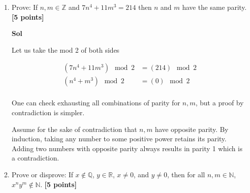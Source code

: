 \documentclass{article}
\begin{document}
\begin{enumerate}
\begin{equation}
    \begin{split}
        \left(\sqrt[3]{3}\right)^3 &= \left(\frac{p}{q}\right)^3\\
        3 &= \frac{p^3}{q^3}
    \end{split}
\end{equation}

from this, we see that \(p^3\) is divisible by \(3\). Since \(3\) is prime, \(p\) must be divisible by 3 by Euler's Theorem. We can rewrite \(p\) as \(3p_1\). 
\begin{equation}
    (3p_1)^3 = 3q^3 = 27p_1^3
\end{equation}

which implies 
\begin{equation}
    q^3 = 9p_1^3 = 3(3p_1^3)
\end{equation}

This also means that \(q^3\) is divisible by \(3\), which applying Euler's Theorem we see implies \(q\) is also divisible by 3. 

\(q\) and \(p\) are divisible by 3 which is a contradiction since we assumed \(\gcd(q,p)=1\).



\item Prove:  If $n, m \in \mathbb{Z}$ and $7 n^4 + 11 m^3 = 214$ then $n$ and $m$ have the same parity.  \textbf{[5 points]}

\textbf{Sol}

Let us take the mod 2 of both sides

\begin{equation}
\begin{split}
        (7 n^4 + 11 m^3) \mod 2 &= (214 ) \mod 2 \\
        (n^4 + m^3) \mod 2 &= (0) \mod 2 \\
\end{split}\end{equation}

One can check exhausting all combinations of parity for \(n,m\), but a proof by contradiction is simpler.

Assume for the sake of contradiction that \(n,m\) have opposite parity. By induction, taking any number to some positive power retains its parity. Adding two numbers with opposite parity always results in parity 1 which is a contradiction.


\item Prove or disprove: If $x \notin \mathbb{Q}$, $y \in \mathbb{R}$, $x \neq 0$, and $y \neq 0$, then for all $n, m \in \mathbb{N}$,  $x^ny^m
\notin \mathbb{N}$.  \textbf{[5 points]}


\end{enumerate}
\end{document}
